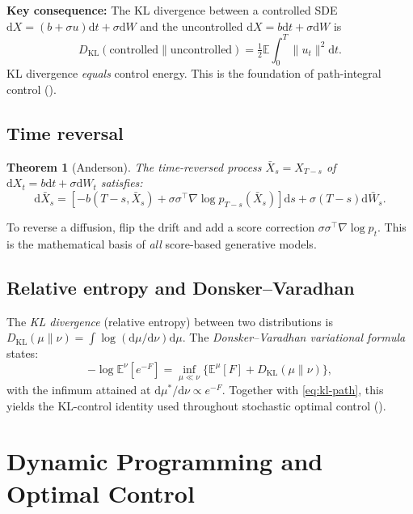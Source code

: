 \documentclass[11pt,letterpaper]{article}
\theoremstyle{plain}
\newtheorem{theorem}{Theorem}[section]
\theoremstyle{definition}
\theoremstyle{remark}
\newcommand{\E}{\mathbb{E}}
\newcommand{\dd}{\mathrm{d}}
\newcommand{\KL}{D_{\mathrm{KL}}}
\newcommand{\grad}{\nabla}
\newcommand{\norm}[1]{\lVert #1\rVert}
\begin{document}
\begin{advancedmath}
\textbf{Key consequence:} The KL divergence between a controlled SDE
$\dd X=(b+\sigma u)\dd t+\sigma\dd W$ and the uncontrolled $\dd X=b\dd t+\sigma\dd W$ is
\begin{equation}
  \KL(\text{controlled}\|\text{uncontrolled})=\tfrac{1}{2}\E\!\int_0^T\!\norm{u_t}^2\dd t.
  \label{eq:kl-path}
\end{equation}
KL divergence \emph{equals} control energy. This is the foundation of
path-integral control ().

\subsection{Time reversal}

\begin{theorem}[Anderson]\label{thm:time-rev}
The time-reversed process $\bar X_s=X_{T-s}$ of
$\dd X_t=b\dd t+\sigma\dd W_t$ satisfies:
\begin{equation}
  \dd\bar X_s=[-b(T\!-\!s,\bar X_s)+\sigma\sigma^\top\!\grad\log p_{T-s}(\bar X_s)]\dd s
  +\sigma(T\!-\!s)\dd\bar W_s.
  \label{eq:time-rev}
\end{equation}
\end{theorem}

To reverse a diffusion, flip the drift and add a score correction
$\sigma\sigma^\top\grad\log p_t$. This is the mathematical basis of
\emph{all} score-based generative models.

\subsection{Relative entropy and Donsker--Varadhan}

The \emph{KL divergence} (relative entropy) between two distributions is
$\KL(\mu\|\nu)=\int\log(\dd\mu/\dd\nu)\dd\mu$.
The \emph{Donsker--Varadhan variational formula} states:
\[
  -\log\E^\nu[e^{-F}]=\inf_{\mu\ll\nu}\{\E^\mu[F]+\KL(\mu\|\nu)\},
\]
with the infimum attained at $\dd\mu^*/\dd\nu\propto e^{-F}$.
Together with \eqref{eq:kl-path}, this yields the KL-control identity
used throughout stochastic optimal control ().

\end{advancedmath}

\section{Dynamic Programming and Optimal Control}\label{sec:dp}
\end{document}
